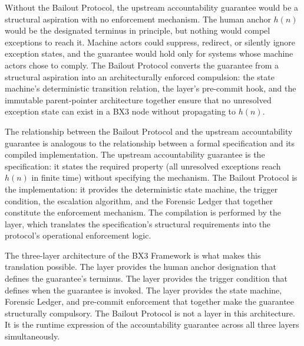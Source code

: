 Without the Bailout Protocol, the upstream accountability guarantee would be a
structural aspiration with no enforcement mechanism.  The human anchor $h(n)$
would be the designated terminus in principle, but nothing would compel
exceptions to reach it.  Machine actors could suppress, redirect, or silently
ignore exception states, and the guarantee would hold only for systems whose
machine actors chose to comply.  The Bailout Protocol converts the guarantee
from a structural aspiration into an architecturally enforced compulsion: the
state machine's deterministic transition relation, the \fact{} layer's
pre-commit hook, and the immutable parent-pointer architecture together ensure
that no unresolved exception state can exist in a BX3 node without propagating
to $h(n)$.

The relationship between the Bailout Protocol and the upstream accountability
guarantee is analogous to the relationship between a formal specification and
its compiled implementation.  The upstream accountability guarantee is the
specification: it states the required property (all unresolved exceptions reach
$h(n)$ in finite time) without specifying the mechanism.  The Bailout Protocol
is the implementation: it provides the deterministic state machine, the
trigger condition, the escalation algorithm, and the Forensic Ledger that
together constitute the enforcement mechanism.  The compilation is performed
by the \fact{} layer, which translates the specification's structural
requirements into the protocol's operational enforcement logic.

The three-layer architecture of the BX3 Framework is what makes this
translation possible.  The \purpose{} layer provides the human anchor
designation that defines the guarantee's terminus.  The \bounds{} layer
provides the trigger condition that defines when the guarantee is invoked.
The \fact{} layer provides the state machine, Forensic Ledger, and
pre-commit enforcement that together make the guarantee structurally
compulsory.  The Bailout Protocol is not a layer in this architecture.
It is the runtime expression of the accountability guarantee across all
three layers simultaneously.